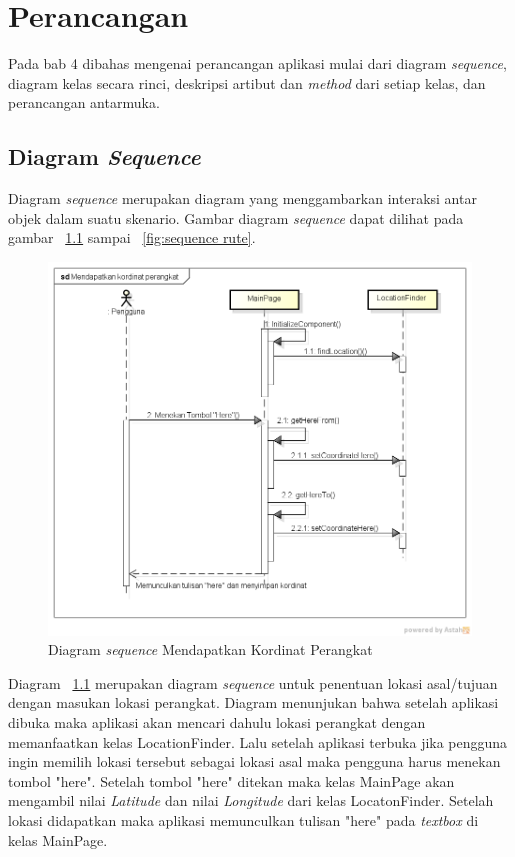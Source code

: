 \chapter{Perancangan}
\label{chap:Perancangan}

Pada bab 4 dibahas mengenai perancangan aplikasi mulai dari diagram \textit{sequence}, diagram kelas secara rinci, deskripsi artibut dan \textit{method} dari setiap kelas, dan perancangan antarmuka.

\section{Diagram \textit{Sequence}}
\label{lab:Diagram Sequence}
\hspace{0.5cm} Diagram \textit{sequence} merupakan diagram yang menggambarkan interaksi antar objek dalam suatu skenario. Gambar diagram \textit{sequence} dapat dilihat pada gambar ~\ref{fig:sequence lokasi perangkat} sampai ~\ref{fig:sequence rute}. 

\begin{figure}[h]
	\centering
		\includegraphics[scale=0.4]{Gambar/sequence/MendapatkanKordinatPerangkat}
	\caption{Diagram \textit{sequence} Mendapatkan Kordinat Perangkat}
	\label{fig:sequence lokasi perangkat}
\end{figure}

\hspace{0.5cm} Diagram ~\ref{fig:sequence lokasi perangkat} merupakan diagram \textit{sequence} untuk penentuan lokasi asal/tujuan dengan masukan lokasi perangkat. Diagram menunjukan bahwa setelah aplikasi dibuka maka aplikasi akan mencari dahulu lokasi perangkat dengan memanfaatkan kelas LocationFinder. Lalu setelah aplikasi terbuka jika pengguna ingin memilih lokasi tersebut sebagai lokasi asal maka pengguna harus menekan tombol "here". Setelah tombol "here" ditekan maka kelas MainPage akan mengambil nilai \textit{Latitude} dan nilai \textit{Longitude} dari kelas LocatonFinder. Setelah lokasi didapatkan maka aplikasi memunculkan tulisan "here" pada \textit{textbox} di kelas MainPage.


